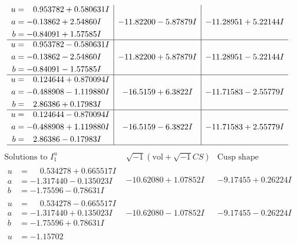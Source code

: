 \documentclass[1p]{elsarticle_modified}
\theoremstyle{definition}
\newcommand{\I}{\sqrt{-1}}
\begin{document}
$$\begin{array}{c|c|c}
\begin{aligned}
u &= \phantom{-}0.953782 + 0.580631 I \\
a &= -0.13862 + 2.54860 I \\
b &= -0.84091 + 1.57585 I\end{aligned}
 & -11.82200 - 5.87879 I & -11.28951 + 5.22144 I \\ \hline\begin{aligned}
u &= \phantom{-}0.953782 - 0.580631 I \\
a &= -0.13862 - 2.54860 I \\
b &= -0.84091 - 1.57585 I\end{aligned}
 & -11.82200 + 5.87879 I & -11.28951 - 5.22144 I \\ \hline\begin{aligned}
u &= \phantom{-}0.124644 + 0.870094 I \\
a &= -0.488908 - 1.119880 I \\
b &= \phantom{-}2.86386 + 0.17983 I\end{aligned}
 & -16.5159 + 6.3822 I & -11.71583 - 2.55779 I \\ \hline\begin{aligned}
u &= \phantom{-}0.124644 - 0.870094 I \\
a &= -0.488908 + 1.119880 I \\
b &= \phantom{-}2.86386 - 0.17983 I\end{aligned}
 & -16.5159 - 6.3822 I & -11.71583 + 2.55779 I\\
 \hline 
 \end{array}$$\newpage$$\begin{array}{c|c|c}  
\text{Solutions to }I^u_{1}& \I (\text{vol} + \sqrt{-1}CS) & \text{Cusp shape}\\
 \hline 
\begin{aligned}
u &= \phantom{-}0.534278 + 0.665517 I \\
a &= -1.317440 - 0.135023 I \\
b &= -1.75596 - 0.78631 I\end{aligned}
 & -10.62080 + 1.07852 I & -9.17455 + 0.26224 I \\ \hline\begin{aligned}
u &= \phantom{-}0.534278 - 0.665517 I \\
a &= -1.317440 + 0.135023 I \\
b &= -1.75596 + 0.78631 I\end{aligned}
 & -10.62080 - 1.07852 I & -9.17455 - 0.26224 I \\ \hline\begin{aligned}
u &= -1.15702\phantom{ +0.000000I} \\

\end{aligned}
\end{array}$$
\end{document}
